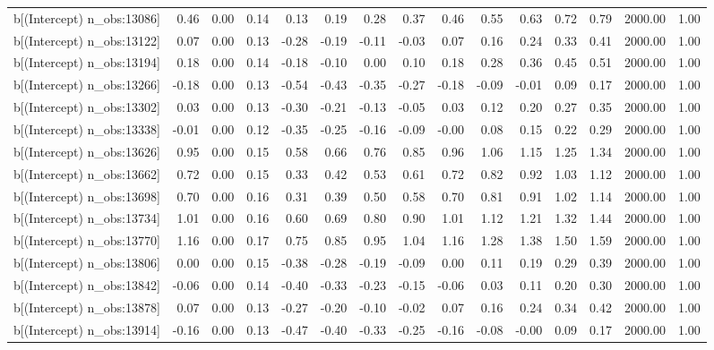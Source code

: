 \begin{table}[ht]
\begin{tabular}{rrrrrrrrrrrrrrr}
  b[(Intercept) n\_obs:13086] & 0.46 & 0.00 & 0.14 & 0.13 & 0.19 & 0.28 & 0.37 & 0.46 & 0.55 & 0.63 & 0.72 & 0.79 & 2000.00 & 1.00 \\ 
  b[(Intercept) n\_obs:13122] & 0.07 & 0.00 & 0.13 & -0.28 & -0.19 & -0.11 & -0.03 & 0.07 & 0.16 & 0.24 & 0.33 & 0.41 & 2000.00 & 1.00 \\ 
  b[(Intercept) n\_obs:13194] & 0.18 & 0.00 & 0.14 & -0.18 & -0.10 & 0.00 & 0.10 & 0.18 & 0.28 & 0.36 & 0.45 & 0.51 & 2000.00 & 1.00 \\ 
  b[(Intercept) n\_obs:13266] & -0.18 & 0.00 & 0.13 & -0.54 & -0.43 & -0.35 & -0.27 & -0.18 & -0.09 & -0.01 & 0.09 & 0.17 & 2000.00 & 1.00 \\ 
  b[(Intercept) n\_obs:13302] & 0.03 & 0.00 & 0.13 & -0.30 & -0.21 & -0.13 & -0.05 & 0.03 & 0.12 & 0.20 & 0.27 & 0.35 & 2000.00 & 1.00 \\ 
  b[(Intercept) n\_obs:13338] & -0.01 & 0.00 & 0.12 & -0.35 & -0.25 & -0.16 & -0.09 & -0.00 & 0.08 & 0.15 & 0.22 & 0.29 & 2000.00 & 1.00 \\ 
  b[(Intercept) n\_obs:13626] & 0.95 & 0.00 & 0.15 & 0.58 & 0.66 & 0.76 & 0.85 & 0.96 & 1.06 & 1.15 & 1.25 & 1.34 & 2000.00 & 1.00 \\ 
  b[(Intercept) n\_obs:13662] & 0.72 & 0.00 & 0.15 & 0.33 & 0.42 & 0.53 & 0.61 & 0.72 & 0.82 & 0.92 & 1.03 & 1.12 & 2000.00 & 1.00 \\ 
  b[(Intercept) n\_obs:13698] & 0.70 & 0.00 & 0.16 & 0.31 & 0.39 & 0.50 & 0.58 & 0.70 & 0.81 & 0.91 & 1.02 & 1.14 & 2000.00 & 1.00 \\ 
  b[(Intercept) n\_obs:13734] & 1.01 & 0.00 & 0.16 & 0.60 & 0.69 & 0.80 & 0.90 & 1.01 & 1.12 & 1.21 & 1.32 & 1.44 & 2000.00 & 1.00 \\ 
  b[(Intercept) n\_obs:13770] & 1.16 & 0.00 & 0.17 & 0.75 & 0.85 & 0.95 & 1.04 & 1.16 & 1.28 & 1.38 & 1.50 & 1.59 & 2000.00 & 1.00 \\ 
  b[(Intercept) n\_obs:13806] & 0.00 & 0.00 & 0.15 & -0.38 & -0.28 & -0.19 & -0.09 & 0.00 & 0.11 & 0.19 & 0.29 & 0.39 & 2000.00 & 1.00 \\ 
  b[(Intercept) n\_obs:13842] & -0.06 & 0.00 & 0.14 & -0.40 & -0.33 & -0.23 & -0.15 & -0.06 & 0.03 & 0.11 & 0.20 & 0.30 & 2000.00 & 1.00 \\ 
  b[(Intercept) n\_obs:13878] & 0.07 & 0.00 & 0.13 & -0.27 & -0.20 & -0.10 & -0.02 & 0.07 & 0.16 & 0.24 & 0.34 & 0.42 & 2000.00 & 1.00 \\ 
  b[(Intercept) n\_obs:13914] & -0.16 & 0.00 & 0.13 & -0.47 & -0.40 & -0.33 & -0.25 & -0.16 & -0.08 & -0.00 & 0.09 & 0.17 & 2000.00 & 1.00 \\ 

\end{tabular}
\end{table}
